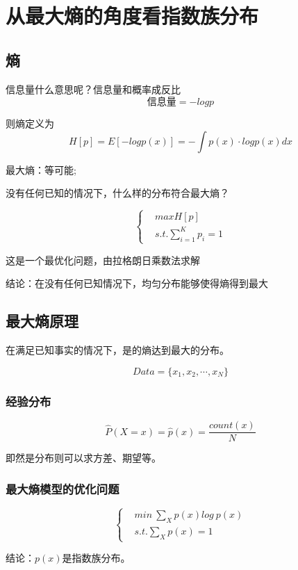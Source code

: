\chapter{从最大熵的角度看指数族分布}

\section{熵}

信息量什么意思呢？信息量和概率成反比
\begin{equation}
    \mbox{信息量}=-log p
\end{equation}

则熵定义为
\begin{equation}
    H[p]=E[-log p(x)]=-\int p(x)\cdot log p(x)dx
\end{equation}

最大熵：等可能;

没有任何已知的情况下，什么样的分布符合最大熵？

\begin{equation}
    \begin{cases}
        & max H[p]\\
        & s.t. \sum_{i=1}^{K}p_i=1
    \end{cases}
\end{equation}

这是一个最优化问题，由拉格朗日乘数法求解


结论：在没有任何已知情况下，均匀分布能够使得熵得到最大



\section{最大熵原理}

在满足已知事实的情况下，是的熵达到最大的分布。

\begin{equation}
    Data=\{x_1,x_2,\cdots,x_N\}
\end{equation}

\subsection*{经验分布}
\begin{equation}
    \hat{P}(X=x)=\hat{p}(x)=\frac{count(x)}{N}
\end{equation}

即然是分布则可以求方差、期望等。

\subsection*{最大熵模型的优化问题}

\begin{equation}
    \begin{cases}
        & min\ \sum\limits_{X}p(x)log\ p(x)\\
        & s.t. \sum\limits_{X}p(x)=1
    \end{cases}
\end{equation}

结论：$p(x)$是指数族分布。

